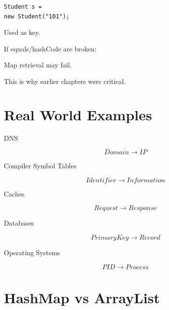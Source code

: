 \documentclass[11pt,a4paper]{book}
\begin{document}
\begin{verbatim} 
Student s =
new Student("101");
\end{verbatim}


Used as key.


If equals/hashCode are broken:


Map retrieval may fail.


This is why earlier chapters were critical.


\section{Real World Examples}


DNS

\[
Domain
\rightarrow
IP
\]


Compiler Symbol Tables

\[
Identifier
\rightarrow
Information
\]


Caches

\[
Request
\rightarrow
Response
\]


Databases

\[
PrimaryKey
\rightarrow
Record
\]


Operating Systems

\[
PID
\rightarrow
Process
\]


\section{HashMap vs ArrayList}
\end{document}
